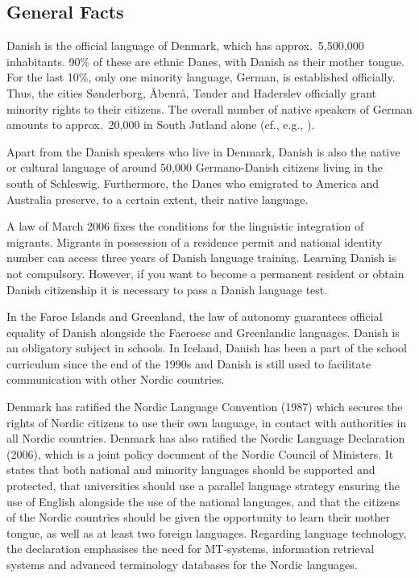 \begin{multicols}{2}

\subsection{General Facts}


Danish is the official language of Denmark, which has approx.\ 5,500,000 inhabitants. 90\% of these are ethnic Danes, with Danish as their mother tongue. For the last 10\%, only one minority language, German, is established officially. Thus, the cities S\o nderborg, \mbox{\AA benr\aa}, T\o nder and Haderslev officially grant minority rights to their citizens. The overall number of native speakers of German amounts to approx.\ 20,000 in South Jutland alone (cf., e.g., \cite{Danmark}).  

Apart from the Danish speakers who live in Denmark, Danish is also the native or cultural language of around 50,000 Germano-Danish citizens living in the south of Schleswig. Furthermore, the Danes who emigrated to America and Australia preserve, to a certain extent, their native language.

A law of March 2006 fixes the conditions for the linguistic integration of migrants. Migrants in possession of a residence permit and national identity number can access three years of Danish language training. Learning Danish is not compulsory. However, if you want to become a permanent resident or obtain Danish citizenship it is necessary to pass a Danish language test.

In the Faroe Islands and Greenland, the law of autonomy guarantees official equality of Danish alongside the Faeroese and Greenlandic languages. Danish is an obligatory subject in schools. In Iceland, Danish has been a part of the school curriculum since the end of the 1990s and Danish is still used to facilitate communication with other Nordic countries. 

Denmark has ratified the Nordic Language Convention (1987) which secures the rights of Nordic citizens to use their own language, in contact with authorities in all Nordic countries.  Denmark has also ratified the Nordic Language Declaration (2006), which is a joint policy document of the Nordic Council of Ministers. It states that both national and minority languages should be supported and protected, that universities should use a parallel language strategy ensuring the use of English alongside the use of the national languages, and that the citizens of the Nordic countries should be given the opportunity to learn their mother tongue, as well as at least two foreign languages.  Regarding language technology, the declaration emphasises the need for MT-systems, information retrieval systems and advanced terminology databases for the Nordic languages.


\end{multicols}
